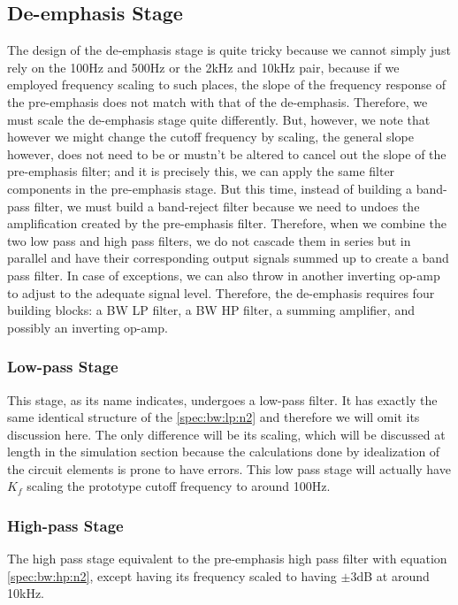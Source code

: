 \documentclass[report]{IEEEtran}
\begin{document}
		\subsection{De-emphasis Stage}
			The design of the de-emphasis stage is quite tricky because we cannot simply just rely on the 100Hz and 500Hz or the 2kHz and 10kHz pair, because if we employed frequency scaling to such places, the slope of the frequency response of the pre-emphasis does not match with that of the de-emphasis. Therefore, we must scale the de-emphasis stage quite differently. But, however, we note that however we might change the cutoff frequency by scaling, the general slope however, does not need to be or mustn't be altered to cancel out the slope of the pre-emphasis filter; and it is precisely this, we can apply the same filter components in the pre-emphasis stage. But this time, instead of building a band-pass filter, we must build a band-reject filter because we need to undoes the amplification created by the pre-emphasis filter. Therefore, when we combine the two low pass and high pass filters, we do not cascade them in series but in parallel and have their corresponding output signals summed up to create a band pass filter. In case of exceptions, we can also throw in another inverting op-amp to adjust to the adequate  signal level. Therefore, the de-emphasis requires four building blocks: a BW LP filter, a BW HP filter, a summing amplifier, and possibly an inverting op-amp.
			
			\subsubsection{Low-pass Stage}
				This stage, as its name indicates, undergoes a low-pass filter. It has exactly the same identical structure of the \eqref{spec:bw:lp:n2} and therefore we will omit its discussion here. The only difference will be its scaling, which will be discussed at length in the simulation section because the calculations done by idealization of the circuit elements is prone to have errors. This low pass stage will actually have $K_f$ scaling the prototype cutoff frequency to around 100Hz.
				
			\subsubsection{High-pass Stage}
				The high pass stage equivalent to the pre-emphasis high pass filter with equation \eqref{spec:bw:hp:n2}, except having its frequency scaled to having $\pm 3$dB at around 10kHz.
			
\end{document}
